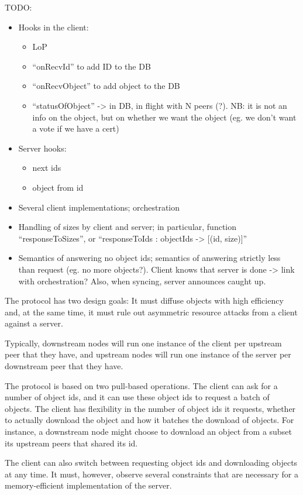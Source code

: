 TODO:
\begin{itemize}
\item Hooks in the client:
  \begin{itemize}
  \item LoP
  \item “onRecvId” to add ID to the DB
  \item “onRecvObject” to add object to the DB
  \item “statusOfObject” -> in DB, in flight with N peers (?). NB: it is not an
    info on the object, but on whether we want the object (eg. we don't want a
    vote if we have a cert)
  \end{itemize}
\item Server hooks:
  \begin{itemize}
  \item next ids
  \item object from id
  \end{itemize}
\item Several client implementations; orchestration
\item Handling of sizes by client and server; in particular, function
  “responseToSizes”, or “responseToIds : objectIds -> [(id, size)]”
\item Semantics of answering no object ids; semantics of answering strictly less
  than request (eg. no more objects?). Client knows that server is done -> link
  with orchestration? Also, when syncing, server announces caught up.
\end{itemize}

The protocol has two design goals: It must diffuse objects with high efficiency
and, at the same time, it must rule out asymmetric resource attacks from a
client against a server.

Typically, downstream nodes will run one instance of the client per upstream
peer that they have, and upstream nodes will run one instance of the server per
downstream peer that they have.

The protocol is based on two pull-based operations. The client can ask for a
number of object ids, and it can use these object ids to request a batch of
objects. The client has flexibility in the number of object ids it requests,
whether to actually download the object and how it batches the download of
objects. For instance, a downstream node might choose to download an object from
a subset its upstream peers that shared its id.

The client can also switch between requesting object ids and downloading objects
at any time. It must, however, observe several constraints that are necessary
for a memory-efficient implementation of the server.

